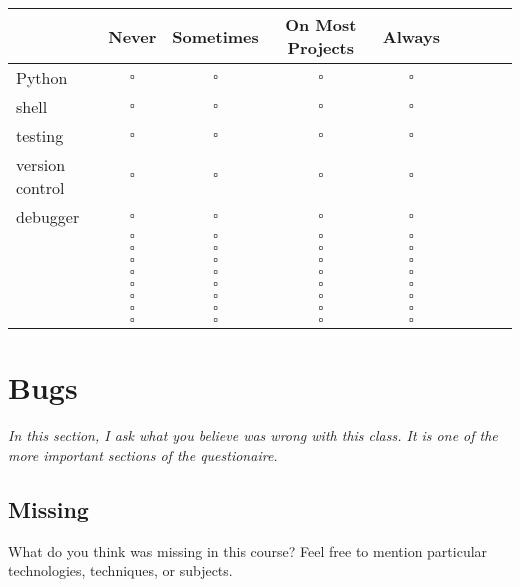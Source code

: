 \documentclass[article,twoside]{memoir}
\newcommand*{\fillunderscore}{~\hrulefill}
\newcommand*{\checkbox}{$\square$}
\newcommand{\header}[1]{\textsl{#1}}
\def\th#1{#1}
\begin{document}
\begin{tabular}[H]{lcccccccc}

\toprule
    & \th{Never} & \th{Sometimes} & \th{On Most Projects} & \th{Always}\\
\midrule
Python             &\checkbox &\checkbox &\checkbox &\checkbox \\
shell              &\checkbox &\checkbox &\checkbox &\checkbox \\
testing            &\checkbox &\checkbox &\checkbox &\checkbox \\
version control    &\checkbox &\checkbox &\checkbox &\checkbox \\
debugger           &\checkbox &\checkbox &\checkbox &\checkbox \\
                   &\checkbox &\checkbox &\checkbox &\checkbox \\
                   &\checkbox &\checkbox &\checkbox &\checkbox \\
                   &\checkbox &\checkbox &\checkbox &\checkbox \\
                   &\checkbox &\checkbox &\checkbox &\checkbox \\
                   &\checkbox &\checkbox &\checkbox &\checkbox \\
                   &\checkbox &\checkbox &\checkbox &\checkbox \\
                   &\checkbox &\checkbox &\checkbox &\checkbox \\
                   &\checkbox &\checkbox &\checkbox &\checkbox \\
\bottomrule
\end{tabular}


\chapter{Bugs}

\header{In this section, I ask what you believe was wrong with this class. It is one of the more important sections of the questionaire.}

\section{Missing}

What do you think was missing in this course? Feel free to mention particular technologies, techniques, or subjects.

\fillunderscore\par
\fillunderscore\par
\fillunderscore\par
\fillunderscore\par
\fillunderscore\par
\fillunderscore\par
\end{document}
